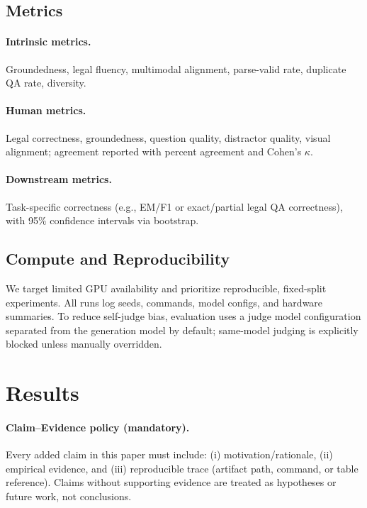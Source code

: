\subsection{Metrics}
\paragraph{Intrinsic metrics.}
Groundedness, legal fluency, multimodal alignment, parse-valid rate, duplicate QA rate, diversity.

\paragraph{Human metrics.}
Legal correctness, groundedness, question quality, distractor quality, visual alignment; agreement reported with percent agreement and Cohen's $\kappa$.

\paragraph{Downstream metrics.}
Task-specific correctness (e.g., EM/F1 or exact/partial legal QA correctness), with 95\% confidence intervals via bootstrap.

\subsection{Compute and Reproducibility}
We target limited GPU availability and prioritize reproducible, fixed-split experiments. All runs log seeds, commands, model configs, and hardware summaries.
To reduce self-judge bias, evaluation uses a judge model configuration separated from the generation model by default; same-model judging is explicitly blocked unless manually overridden.

\section{Results}
\label{sec:results}
\paragraph{Claim--Evidence policy (mandatory).}
Every added claim in this paper must include: (i) motivation/rationale, (ii) empirical evidence, and (iii) reproducible trace (artifact path, command, or table reference). Claims without supporting evidence are treated as hypotheses or future work, not conclusions.

